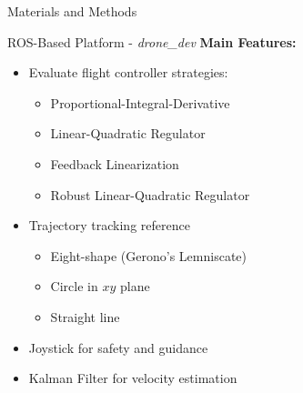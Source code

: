 \begin{frame}{Materials and Methods}
\begin{block}{ROS-Based Platform - \textit{drone\_dev}}
\textbf{Main Features:}
\begin{itemize}
	\item Evaluate flight controller strategies:
	\begin{itemize}
		\item Proportional-Integral-Derivative
		\item Linear-Quadratic Regulator
		\item Feedback Linearization
		\item Robust Linear-Quadratic Regulator
	\end{itemize}
	\item Trajectory tracking reference
	\begin{itemize}
		\item Eight-shape (Gerono's Lemniscate)
		\item Circle in $xy$ plane
		\item Straight line 
	\end{itemize}
	\item Joystick for safety and guidance
	\item Kalman Filter for velocity estimation
\end{itemize}

\end{block}
\end{frame}



